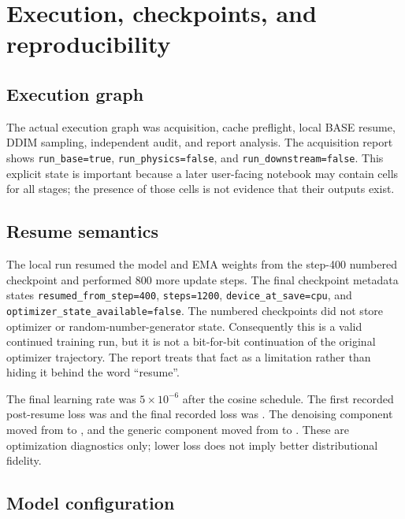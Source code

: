 \documentclass[11pt,oneside]{report}
\begin{document}
\chapter{Execution, checkpoints, and reproducibility}

\section{Execution graph}

The actual execution graph was acquisition, cache preflight, local BASE resume, DDIM sampling, independent audit, and report analysis. The acquisition report shows \texttt{run\_base=true}, \texttt{run\_physics=false}, and \texttt{run\_downstream=false}. This explicit state is important because a later user-facing notebook may contain cells for all stages; the presence of those cells is not evidence that their outputs exist.

\section{Resume semantics}

The local run resumed the model and EMA weights from the step-400 numbered checkpoint and performed 800 more update steps. The final checkpoint metadata states \texttt{resumed\_from\_step=400}, \texttt{steps=1200}, \texttt{device\_at\_save=cpu}, and \texttt{optimizer\_state\_available=false}. The numbered checkpoints did not store optimizer or random-number-generator state. Consequently this is a valid continued training run, but it is not a bit-for-bit continuation of the original optimizer trajectory. The report treats that fact as a limitation rather than hiding it behind the word ``resume''.

The final learning rate was $5\times10^{-6}$ after the cosine schedule. The first recorded post-resume loss was \StartLoss{} and the final recorded loss was \EndLoss{}. The denoising component moved from \StartDenoise{} to \EndDenoise{}, and the generic component moved from \StartGeneric{} to \EndGeneric{}. These are optimization diagnostics only; lower loss does not imply better distributional fidelity.

\section{Model configuration}
\end{document}

